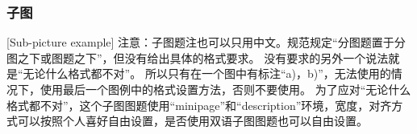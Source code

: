 \begin{figure}[htbp]
\begin{minipage}[t]{0.4\textwidth}
  \end{minipage}
\end{figure}

\subsubsection{子图}[Sub-picture example]
注意：子图题注也可以只用中文。规范规定“分图题置于分图之下或图题之下”，但没有给出具体的格式要求。
没有要求的另外一个说法就是“无论什么格式都不对”。
所以只有在一个图中有标注“a)，b)”，无法使用的情况下，使用最后一个图例中的格式设置方法，否则不要使用。
为了应对“无论什么格式都不对”，这个子图图题使用“minipage”和“description”环境，宽度，对齐方式可以按照个人喜好自由设置，是否使用双语子图图题也可以自由设置。

